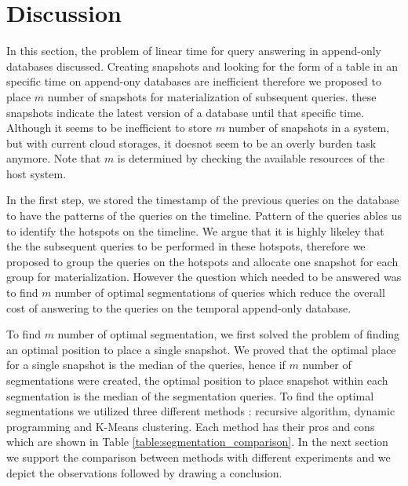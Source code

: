 \section{Discussion}
In this section, the problem of linear time for query answering in append-only databases discussed. Creating snapshots and looking for the form of a table in an specific time on append-ony databases are inefficient therefore we proposed to place $m$ number of snapshots for materialization of subsequent queries. these snapshots indicate the latest version of a database until that specific time. Although it seems to be inefficient to store $m$ number of snapshots in a system, but with current cloud storages, it doesnot seem to be an overly burden task anymore. Note that $m$ is determined by checking the available resources of the host system.

In the first step, we stored the timestamp of the previous queries on the database to have the patterns of the queries on the timeline. Pattern of the queries ables us to identify the hotspots on the timeline. We argue that it is highly likeley that the the subsequent queries to be performed in these hotspots, therefore we proposed to group the queries on the hotspots and allocate one snapshot for each group for materialization. However the question which needed to be answered was to find $m$ number of optimal segmentations of queries which reduce the overall cost of answering to the queries on the temporal append-only database.

To find $m$ number of optimal segmentation, we first solved the problem of finding an optimal position to place a single snapshot. We proved that the optimal place for a single snapshot is the median of the queries, hence if $m$ number of segmentations were created, the optimal position to place snapshot within each segmentation is the median of the segmentation queries. To find the optimal segmentations we utilized three different methods : recursive algorithm, dynamic programming and K-Means clustering. Each method has their pros and cons which are shown in Table \ref{table:segmentation_comparison}. In the next section we support the comparison between methods with different experiments and we depict the observations followed by drawing a conclusion. 

